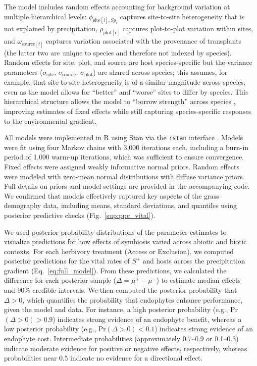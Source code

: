 \documentclass[12pt]{article}\usepackage[]{graphicx}\usepackage[dvipsnames]{xcolor}
\newcommand{\revise}[1]{{\color{Mahogany}{#1}}}
\begin{document}
The model includes random effects accounting for background variation at multiple hierarchical levels: $\phi_{\text{site}[i],Sp_i}$ captures site-to-site heterogeneity that is not explained by precipitation, $\rho_{\text{plot}[i]}$ captures plot-to-plot variation within sites, and $\omega_{\text{source}[i]}$ captures variation associated with the provenance of transplants (the latter two are unique to species and therefore not indexed by species).
Random effects for site, plot, and source are host species-specific but the variance parameters ($\sigma_{\text{site}}$, $\sigma_{\text{source}}$, $\sigma_{\text{plot}}$) are shared across species; this assumes, for example, that site-to-site heterogeneity is of a similar magnitude across species, even as the model allows for ``better'' and ``worse'' sites to differ by species. 
This hierarchical structure allows the model to ``borrow strength'' across species \citep{gelman2007data}, improving estimates of fixed effects while still capturing species-specific responses to the environmental gradient.

All models were implemented in R \citep{RCoreTeam} using Stan via the \texttt{rstan} interface \citep{Rstan}. 
Models were fit using four Markov chains with 3,000 iterations each, including a burn-in period of 1,000 warm-up iterations, which was sufficient to ensure convergence.
Fixed effects were assigned weakly informative normal priors. 
Random effects were modeled with zero-mean normal distributions with diffuse variance priors. 
Full details on priors and model settings are provided in the accompanying code.
We confirmed that models effectively captured key aspects of the grass demography data, including means, standard deviations, and quantiles  using posterior predictive checks (Fig.~\ref{sup:ppc_vital}).

We used posterior probability distributions of the parameter estimates to visualize predictions for how effects of symbiosis varied across abiotic and biotic contexts.
For each herbivory treatment (Access or Exclusion), we computed posterior predictions for the vital rates of $S^+$ and \revise{\linelabel{Sminus8}S\textminus} hosts across the precipitation gradient (Eq.~\ref{eq:full_model}).
From these predictions, we calculated the difference for each posterior sample ($\Delta = \mu^{+} - \mu^{-}$) to estimate median effects and 90\% credible intervals.
We then computed the posterior probability that $\Delta > 0$, which quantifies the probability that endophytes enhance performance, given the model and data.
For instance, a high posterior probability (e.g., Pr$(\Delta>0) >0.9$) indicates strong evidence of an endophyte benefit, whereas a low posterior probability (e.g., Pr$(\Delta>0) <0.1$) indicates strong evidence of an endophyte cost.
Intermediate probabilities (approximately 0.7--0.9 or 0.1--0.3) indicate moderate evidence for positive or negative effects, respectively, whereas probabilities near 0.5 indicate no evidence for a directional effect.
\end{document}
